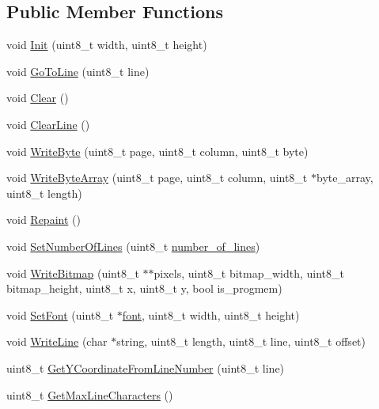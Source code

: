 \subsection*{Public Member Functions}
\begin{DoxyCompactItemize}
\item 
void \hyperlink{class_o_l_e_d_a2c8205c8eac9d7a2b181657561e9b4d2}{Init} (uint8\+\_\+t width, uint8\+\_\+t height)
\item 
void \hyperlink{class_o_l_e_d_a8d314130676b104ed959b92ab4bac25e}{Go\+To\+Line} (uint8\+\_\+t line)
\item 
void \hyperlink{class_o_l_e_d_a6c7bb1fc91b3e574a275f90643da140a}{Clear} ()
\item 
void \hyperlink{class_o_l_e_d_a3a571f5ea7a183fa14932cd5b2c423eb}{Clear\+Line} ()
\item 
void \hyperlink{class_o_l_e_d_a7fa307269dbd2e80a6e48a1442df83d2}{Write\+Byte} (uint8\+\_\+t page, uint8\+\_\+t column, uint8\+\_\+t byte)
\item 
void \hyperlink{class_o_l_e_d_a7fffc17a5439300d361414c15a7a2dbe}{Write\+Byte\+Array} (uint8\+\_\+t page, uint8\+\_\+t column, uint8\+\_\+t $\ast$byte\+\_\+array, uint8\+\_\+t length)
\item 
void \hyperlink{class_o_l_e_d_a3efa34861b4ae0bc5323f6b7cf1d8a01}{Repaint} ()
\item 
void \hyperlink{class_o_l_e_d_aa3c88e19f05340036ea5ac9e2d1ea5dc}{Set\+Number\+Of\+Lines} (uint8\+\_\+t \hyperlink{class_o_l_e_d_a9ea1c55112deede1a61142af276a6bc9}{number\+\_\+of\+\_\+lines})
\item 
void \hyperlink{class_o_l_e_d_a3cb468f16387343f6db387a86cded8af}{Write\+Bitmap} (uint8\+\_\+t $\ast$$\ast$pixels, uint8\+\_\+t bitmap\+\_\+width, uint8\+\_\+t bitmap\+\_\+height, uint8\+\_\+t x, uint8\+\_\+t y, bool is\+\_\+progmem)
\item 
void \hyperlink{class_o_l_e_d_abe6073c961cadc4c9b693eb8dc8198bd}{Set\+Font} (uint8\+\_\+t $\ast$\hyperlink{class_o_l_e_d_a29ab86a4a73f4d343bf1810927f0911d}{font}, uint8\+\_\+t width, uint8\+\_\+t height)
\item 
void \hyperlink{class_o_l_e_d_a0ffccb4fd874b997c869c5d511f76df8}{Write\+Line} (char $\ast$string, uint8\+\_\+t length, uint8\+\_\+t line, uint8\+\_\+t offset)
\item 
uint8\+\_\+t \hyperlink{class_o_l_e_d_a5b6d41d5d699998f54ea6e3b6562ac5b}{Get\+Y\+Coordinate\+From\+Line\+Number} (uint8\+\_\+t line)
\item 
uint8\+\_\+t \hyperlink{class_o_l_e_d_a7bb08915b685741c60bdccdd47781560}{Get\+Max\+Line\+Characters} ()
\end{DoxyCompactItemize}
